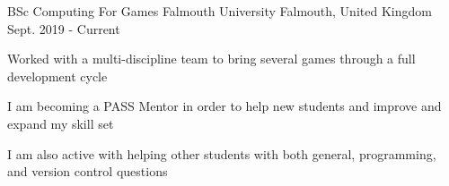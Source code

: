 

\begin{cventries}

  \cventry
    {BSc Computing For Games} %
    {Falmouth University} %
    {Falmouth, United Kingdom} %
    {Sept. 2019 - Current} %
    {
      \begin{cvitems} %
        \item Worked with a multi-discipline team to bring several games through a full development cycle
        \item I am becoming a PASS Mentor in order to help new students and improve and expand my skill set
        \item I am also active with helping other students with both general, programming, and version control questions
      \end{cvitems}
    }

\end{cventries}

